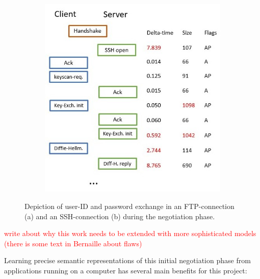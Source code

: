 \documentclass[a4paper,12pt,twoside]{report}
\begin{document}
\begin{figure}
\begin{subfigure}[b]{0.49\textwidth}
\includegraphics[width=\textwidth]{images/SSH.jpg}
\caption{}
\end{subfigure}
\caption{Depiction of user-ID and password exchange in an FTP-connection (a) and an SSH-connection (b) during the negotiation phase.}
\end{figure}

\textcolor{red}{write about why this work needs to be extended with more sophisticated models (there is some text in Bernaille about flaws)}



Learning precise semantic representations of this initial negotiation phase from applications running on a computer has several main benefits for this project: 
\end{document}

